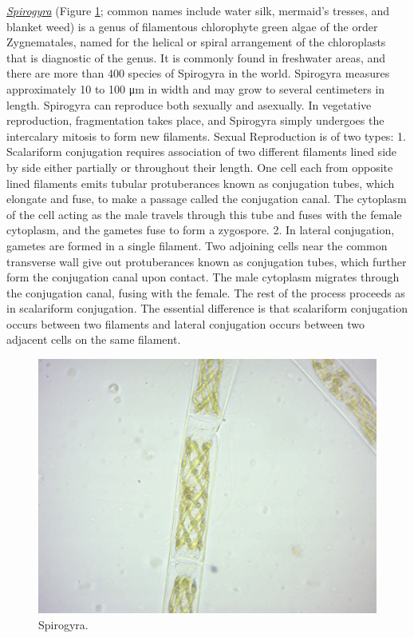 \href{https://en.wikipedia.org/wiki/Spirogyra}{\emph{Spirogyra}} (Figure
\ref{fig:spiro}; common names include water silk, mermaid's tresses, and
blanket weed) is a genus of filamentous chlorophyte green algae of the
order Zygnematales, named for the helical or spiral arrangement of the
chloroplasts that is diagnostic of the genus. It is commonly found in
freshwater areas, and there are more than 400 species of Spirogyra in
the world. Spirogyra measures approximately 10 to 100 μm in width and
may grow to several centimeters in length. Spirogyra can reproduce both
sexually and asexually. In vegetative reproduction, fragmentation takes
place, and Spirogyra simply undergoes the intercalary mitosis to form
new filaments. Sexual Reproduction is of two types: 1. Scalariform
conjugation requires association of two different filaments lined side
by side either partially or throughout their length. One cell each from
opposite lined filaments emits tubular protuberances known as
conjugation tubes, which elongate and fuse, to make a passage called the
conjugation canal. The cytoplasm of the cell acting as the male travels
through this tube and fuses with the female cytoplasm, and the gametes
fuse to form a zygospore. 2. In lateral conjugation, gametes are formed
in a single filament. Two adjoining cells near the common transverse
wall give out protuberances known as conjugation tubes, which further
form the conjugation canal upon contact. The male cytoplasm migrates
through the conjugation canal, fusing with the female. The rest of the
process proceeds as in scalariform conjugation. The essential difference
is that scalariform conjugation occurs between two filaments and lateral
conjugation occurs between two adjacent cells on the same filament.

\begin{figure}

{\centering \includegraphics[width=0.7\linewidth]{./figures/protists/Spirogyra}

}

\caption{Spirogyra.}\label{fig:spiro}
\end{figure}

